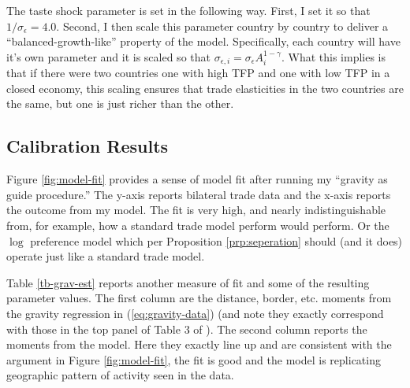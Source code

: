 \documentclass[12pt,pdftex]{article}
\begin{document}
\begin{onehalfspacing}
The taste shock parameter is set in the following way. First, I set it so that $1 / \sigma_{\epsilon} = 4.0$. Second, I then scale this parameter country by country to deliver a ``balanced-growth-like'' property of the model. Specifically, each country will have it's own parameter and it is scaled so that $\sigma_{\epsilon,i} = \sigma_{\epsilon} A_i^{1-\gamma}$. What this implies is that if there were two countries  one with high TFP and one with low TFP in a closed economy, this scaling ensures that trade elasticities in the two countries are the same, but one is just richer than the other.

\subsection{Calibration Results}

Figure \ref{fig:model-fit} provides a sense of model fit after running my ``gravity as guide procedure.'' The y-axis reports bilateral trade data and the x-axis reports the outcome from my model. The fit is very high, and nearly indistinguishable from, for example, how a standard trade model perform would perform. Or the $\log$ preference model which per Proposition \ref{prp:seperation} should (and it does) operate just like a standard trade model.

Table \ref{tb-grav-est} reports another measure of fit and some of the resulting parameter values. The first column are the distance, border, etc. moments from the gravity regression in (\ref{eq:gravity-data}) (and note they exactly correspond with those in the top panel of Table 3 of \citet{eaton2002technology}). The second column reports the moments from the model. Here they exactly line up and are consistent with the argument in Figure \ref{fig:model-fit}, the fit is good and the model is replicating geographic pattern of activity seen in the data.


\end{onehalfspacing}
\end{document}
